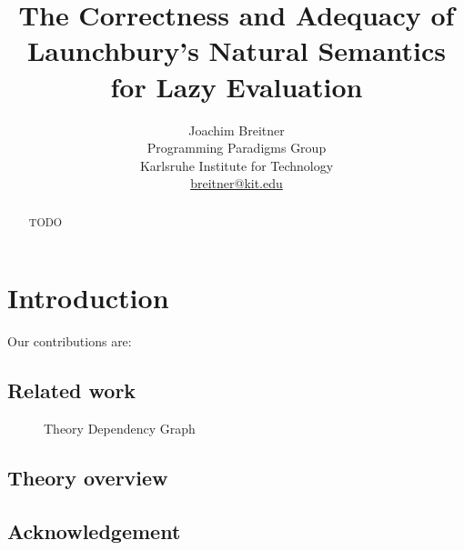 \documentclass[11pt,a4paper,parskip=half]{scrartcl}
\begin{document}
\title{The Correctness and Adequacy of Launchbury's Natural Semantics for Lazy Evaluation}
\author{Joachim Breitner\\
Programming Paradigms Group\\
Karlsruhe Institute for Technology\\
\url{breitner@kit.edu}}
\maketitle

\begin{abstract}
TODO
\end{abstract}

\tableofcontents

\section{Introduction}

Our contributions are:

% 

\subsection{Related work}

\begin{figure}
\begin{center}
\end{center}
\caption{Theory Dependency Graph\label{theory-deps}}
\end{figure}

\subsection{Theory overview}

\subsection{Acknowledgement}

\clearpage
\newcommand{\theory}[1]{\subsection{#1}\label{sec_#1}}

\end{document}
